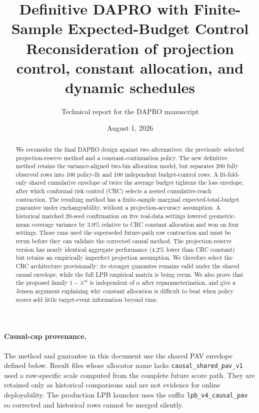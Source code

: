 \documentclass[10pt]{article}
\title{Definitive DAPRO with Finite-Sample Expected-Budget Control\\
\large Reconsideration of projection control, constant allocation, and dynamic schedules}
\author{Technical report for the DAPRO manuscript}
\date{August 1, 2026}
\newcounter{assumption}
\begin{document}
\maketitle

\begin{abstract}
We reconsider the final DAPRO design against two alternatives: the previously
selected projection-reserve method and a constant-continuation policy.  The
new definitive method retains the variance-aligned two-bin allocation model,
but separates 200 fully observed rows into 100 policy-fit and 100 independent
budget-control rows.  A fit-fold-only shared cumulative envelope of twice the
average budget tightens the loss envelope, after which conformal risk control (CRC)
selects a nested cumulative-reach contraction.  The resulting method has a
finite-sample marginal expected-total-budget guarantee under exchangeability,
without a projection-accuracy assumption.  A historical matched 20-seed
confirmation on five real-data settings lowered geometric-mean coverage
variance by 3.9\% relative to CRC constant allocation and won on four settings.
Those runs used the superseded future-path row contraction and must be rerun
before they can validate the corrected causal method.  The
projection-reserve version has nearly identical aggregate performance (4.2\%
lower than CRC constant) but retains an empirically imperfect projection
assumption.  We therefore select the CRC architecture provisionally: its
stronger guarantee remains valid under the shared causal envelope, while the
full LPB empirical matrix is being rerun.  We also prove that the proposed family
$1-\lambda^{\alpha t}$ is independent of $\alpha$ after reparameterization,
and give a Jensen argument explaining why constant allocation is difficult to
beat when policy scores add little target-event information beyond time.
\end{abstract}

\paragraph{Causal-cap provenance.}
The method and guarantee in this document use the shared PAV envelope defined
below.  Result files whose allocator name lacks
\texttt{causal\_shared\_pav\_v1} used a row-specific scale computed from the
complete future score path.  They are retained only as historical comparisons
and are not evidence for online deployability.  The production LPB launcher
uses the suffix \texttt{lpb\_v4\_causal\_pav} so corrected and historical
rows cannot be merged silently.
\end{document}
